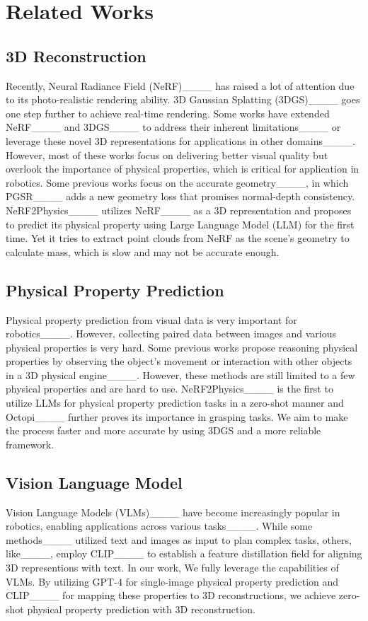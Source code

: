 \section{Related Works}
\subsection{3D Reconstruction}
Recently, Neural Radiance Field (NeRF)____ has raised a lot of attention due to its photo-realistic rendering ability. 3D Gaussian Splatting (3DGS)____ goes one step further to achieve real-time rendering. Some works have extended NeRF____ and 3DGS____ to address their inherent limitations____ or leverage these novel 3D representations for applications in other domains____. However, most of these works focus on delivering better visual quality but overlook the importance of physical properties, which is critical for application in robotics.
Some previous works focus on the accurate geometry____, in which PGSR____ adds a new geometry loss that promises normal-depth consistency. NeRF2Physics____ utilizes NeRF____ as a 3D representation and proposes to predict its physical property using Large Language Model (LLM) for the first time. Yet it tries to extract point clouds from NeRF as the scene's geometry to calculate mass, which is slow and may not be accurate enough.

\subsection{Physical Property Prediction}
Physical property prediction from visual data is very important for robotics____. However, collecting paired data between images and various physical properties is very hard. Some previous works propose reasoning physical properties by observing the object's movement or interaction with other objects in a 3D physical engine____. However, these methods are still limited to a few physical properties and are hard to use. NeRF2Physics____ is the first to utilize LLMs for physical property prediction tasks in a zero-shot manner and Octopi____ further proves its importance in grasping tasks. We aim to make the process faster and more accurate by using 3DGS and a more reliable framework.

\subsection{Vision Language Model}
Vision Language Models (VLMs)____ have become increasingly popular in robotics, enabling applications across various tasks____. While some methods____ utilized text and images as input to plan complex tasks, others, like____, employ CLIP____ to establish a feature distillation field for aligning 3D representions with text. In our work, We fully leverage the capabilities of VLMs. By utilizing GPT-4 for single-image physical property prediction and CLIP____ for mapping these properties to 3D reconstructions, we achieve zero-shot physical property prediction with 3D reconstruction.

